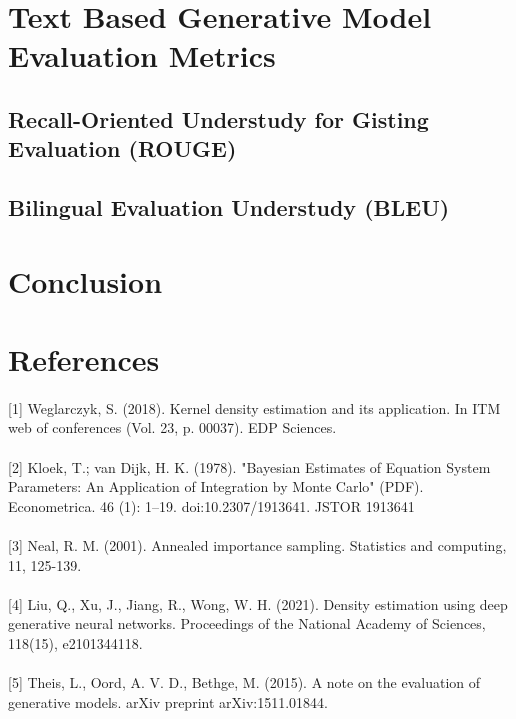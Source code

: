 \documentclass{article}
\begin{document}
        
    
\section{Text Based Generative Model Evaluation Metrics}
    \subsection{Recall-Oriented Understudy for Gisting Evaluation (ROUGE)}
    \subsection{Bilingual Evaluation Understudy (BLEU)}

\section{Conclusion}

\section{References}
\paragraph{}
\label{sec: ref1} [1] Weglarczyk, S. (2018). Kernel density estimation and its application. In ITM web of conferences (Vol. 23, p. 00037). EDP Sciences.
\paragraph{}
\label{sec: ref2}[2]  Kloek, T.; van Dijk, H. K. (1978). "Bayesian Estimates of Equation System Parameters: An Application of Integration by Monte Carlo" (PDF). Econometrica. 46 (1): 1–19. doi:10.2307/1913641. JSTOR 1913641
\paragraph{}
\label{sec: ref3} [3] Neal, R. M. (2001). Annealed importance sampling. Statistics and computing, 11, 125-139.
\paragraph{}
\label{sec: ref4} [4] Liu, Q., Xu, J., Jiang, R., Wong, W. H. (2021). Density estimation using deep generative neural networks. Proceedings of the National Academy of Sciences, 118(15), e2101344118.
\paragraph{}
\label{sec: ref5} [5] Theis, L., Oord, A. V. D.,  Bethge, M. (2015). A note on the evaluation of generative models. arXiv preprint arXiv:1511.01844.
\end{document}
